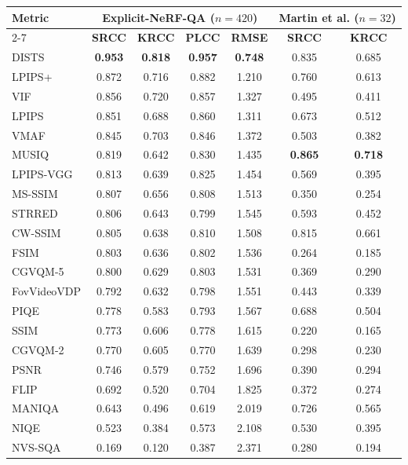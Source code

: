 \begin{tabular}{l|cccc|cc}
\hline
\multirow{2}{*}{\textbf{Metric}} & \multicolumn{4}{c|}{\textbf{Explicit-NeRF-QA ($n = 420$)}} & \multicolumn{2}{c}{\textbf{Martin et al. ($n = 32$)}} \\
\cline{2-7}
 & \textbf{SRCC} & \textbf{KRCC} & \textbf{PLCC} & \textbf{RMSE} & \textbf{SRCC} & \textbf{KRCC} \\
\hline
DISTS & \textbf{0.953} & \textbf{0.818} & \textbf{0.957} & \textbf{0.748} & 0.835 & 0.685 \\
LPIPS+ & 0.872 & 0.716 & 0.882 & 1.210 & 0.760 & 0.613 \\
VIF & 0.856 & 0.720 & 0.857 & 1.327 & 0.495 & 0.411 \\
LPIPS & 0.851 & 0.688 & 0.860 & 1.311 & 0.673 & 0.512 \\
VMAF & 0.845 & 0.703 & 0.846 & 1.372 & 0.503 & 0.382 \\
MUSIQ & 0.819 & 0.642 & 0.830 & 1.435 & \textbf{0.865} & \textbf{0.718} \\
LPIPS-VGG & 0.813 & 0.639 & 0.825 & 1.454 & 0.569 & 0.395 \\
MS-SSIM & 0.807 & 0.656 & 0.808 & 1.513 & 0.350 & 0.254 \\
STRRED & 0.806 & 0.643 & 0.799 & 1.545 & 0.593 & 0.452 \\
CW-SSIM & 0.805 & 0.638 & 0.810 & 1.508 & 0.815 & 0.661 \\
FSIM & 0.803 & 0.636 & 0.802 & 1.536 & 0.264 & 0.185 \\
CGVQM-5 & 0.800 & 0.629 & 0.803 & 1.531 & 0.369 & 0.290 \\
FovVideoVDP & 0.792 & 0.632 & 0.798 & 1.551 & 0.443 & 0.339 \\
PIQE & 0.778 & 0.583 & 0.793 & 1.567 & 0.688 & 0.504 \\
SSIM & 0.773 & 0.606 & 0.778 & 1.615 & 0.220 & 0.165 \\
CGVQM-2 & 0.770 & 0.605 & 0.770 & 1.639 & 0.298 & 0.230 \\
PSNR & 0.746 & 0.579 & 0.752 & 1.696 & 0.390 & 0.294 \\
FLIP & 0.692 & 0.520 & 0.704 & 1.825 & 0.372 & 0.274 \\
MANIQA & 0.643 & 0.496 & 0.619 & 2.019 & 0.726 & 0.565 \\
NIQE & 0.523 & 0.384 & 0.573 & 2.108 & 0.530 & 0.395 \\
NVS-SQA & 0.169 & 0.120 & 0.387 & 2.371 & 0.280 & 0.194 \\
\hline
\end{tabular}

